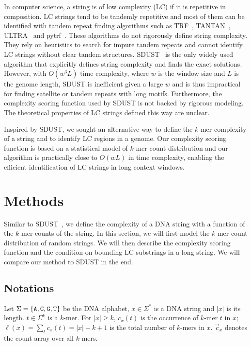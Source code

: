 \documentclass[webpdf,contemporary,large,namedate]{oup-authoring-template}%
\begin{document}
In computer science, a string is of low complexity (LC) if it is repetitive in composition.
LC strings tend to be tandemly repetitive and
most of them can be identified with tandem repeat finding algorithms such as
TRF~\citep{Benson:1999aa}, TANTAN~\citep{Frith:2011aa}, ULTRA~\citep{Olson:2024aa} and pytrf~\citep{Du:2025aa}.
These algorithms do not rigorously define string complexity.
They rely on heuristics to search for impure tandem repeats
and cannot identify LC strings without clear tandem structures.
SDUST~\citep{Morgulis:2006aa} is the only widely used algorithm that explicitly defines string complexity
and finds the exact solutions.
However, with $O(w^3L)$ time complexity, where $w$ is the window size and $L$ is the genome length,
SDUST is inefficient given a large $w$ and is thus impractical for finding satellite or tandem repeats with long motifs.
Furthermore, the complexity scoring function used by SDUST is not backed by rigorous modeling.
The theoretical properties of LC strings defined this way are unclear.

Inspired by SDUST, we sought an alternative way to define the $k$-mer complexity of a string
and to identify LC regions in a genome.
Our complexity scoring function is based on a statistical model of $k$-mer count distribution
and our algorithm is practically close to $O(wL)$ in time complexity,
enabling the efficient identification of LC strings in long context windows.

\section{Methods}

Similar to SDUST~\citep{Morgulis:2006aa}, we define the complexity of a DNA string with a function of the $k$-mer counts of the string.
In this section, we will first model the $k$-mer count distribution of random strings.
We will then describe the complexity scoring function and the condition on bounding LC substrings in a long string.
We will compare our method to SDUST in the end.

\subsection{Notations}

Let $\Sigma=\{{\tt A},{\tt C},{\tt G},{\tt T}\}$ be the DNA alphabet,
$x\in\Sigma^*$ is a DNA string and $|x|$ is its length.
$t\in\Sigma^k$ is a $k$-mer.
For $|x|\ge k$, $c_x(t)$ is the occurrence of $k$-mer $t$ in $x$;
$\ell(x)=\sum_t c_x(t)=|x|-k+1$ is the total number of $k$-mers in $x$.
$\vec{c}_x$ denotes the count array over all $k$-mers.
\end{document}
